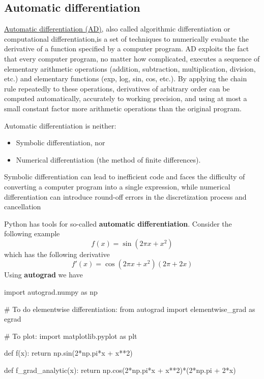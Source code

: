 \documentclass[%
oneside,                 %
final,                   %
10pt]{article}
\begin{document}
\subsection{Automatic differentiation}

\href{{https://en.wikipedia.org/wiki/Automatic_differentiation}}{Automatic differentiation (AD)}, 
also called algorithmic
differentiation or computational differentiation,is a set of
techniques to numerically evaluate the derivative of a function
specified by a computer program. AD exploits the fact that every
computer program, no matter how complicated, executes a sequence of
elementary arithmetic operations (addition, subtraction,
multiplication, division, etc.) and elementary functions (exp, log,
sin, cos, etc.). By applying the chain rule repeatedly to these
operations, derivatives of arbitrary order can be computed
automatically, accurately to working precision, and using at most a
small constant factor more arithmetic operations than the original
program.

Automatic differentiation is neither:

\begin{itemize}
\item Symbolic differentiation, nor

\item Numerical differentiation (the method of finite differences).
\end{itemize}

\noindent
Symbolic differentiation can lead to inefficient code and faces the
difficulty of converting a computer program into a single expression,
while numerical differentiation can introduce round-off errors in the
discretization process and cancellation



Python has tools for so-called \textbf{automatic differentiation}.
Consider the following example
\[
f(x) = \sin\left(2\pi x + x^2\right)
\]
which has the following derivative
\[
f'(x) = \cos\left(2\pi x + x^2\right)\left(2\pi + 2x\right) 
\]
Using \textbf{autograd} we have

\bpycod
import autograd.numpy as np

# To do elementwise differentiation:
from autograd import elementwise_grad as egrad 

# To plot:
import matplotlib.pyplot as plt 


def f(x):
    return np.sin(2*np.pi*x + x**2)

def f_grad_analytic(x):
    return np.cos(2*np.pi*x + x**2)*(2*np.pi + 2*x)
\end{document}
